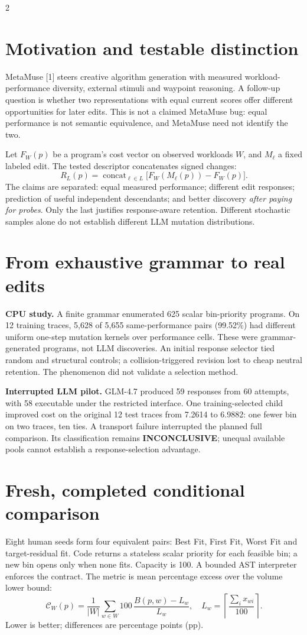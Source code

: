 \documentclass[10pt,letterpaper]{article}
\newcommand{\cost}{\mathcal{C}}
\begin{document}
\begin{multicols}{2}
\section{Motivation and testable distinction}
MetaMuse [1] steers creative algorithm generation with measured workload-performance diversity, external stimuli and waypoint reasoning. A follow-up question is whether two representations with equal current scores offer different opportunities for later edits. This is not a claimed MetaMuse bug: equal performance is not semantic equivalence, and MetaMuse need not identify the two.

Let $F_W(p)$ be a program's cost vector on observed workloads $W$, and $M_\ell$ a fixed labeled edit. The tested descriptor concatenates signed changes:
\[
R_L(p)=\mathop{\mathrm{concat}}_{\ell\in L}
\bigl[F_W(M_\ell(p))-F_W(p)\bigr].
\]
The claims are separated: equal measured performance; different edit responses; prediction of useful independent descendants; and better discovery \emph{after paying for probes}. Only the last justifies response-aware retention. Different stochastic samples alone do not establish different LLM mutation distributions.

\section{From exhaustive grammar to real edits}
\textbf{CPU study.} A finite grammar enumerated 625 scalar bin-priority programs. On 12 training traces, 5,628 of 5,655 same-performance pairs (99.52\%) had different uniform one-step mutation kernels over performance cells. These were grammar-generated programs, not LLM discoveries. An initial response selector tied random and structural controls; a collision-triggered revision lost to cheap neutral retention. The phenomenon did not validate a selection method.

\textbf{Interrupted LLM pilot.} GLM-4.7 produced 59 responses from 60 attempts, with 58 executable under the restricted interface. One training-selected child improved cost on the original 12 test traces from 7.2614 to 6.9882: one fewer bin on two traces, ten ties. A transport failure interrupted the planned full comparison. Its classification remains \textbf{INCONCLUSIVE}; unequal available pools cannot establish a response-selection advantage.

\section{Fresh, completed conditional comparison}
Eight human seeds form four equivalent pairs: Best Fit, First Fit, Worst Fit and target-residual fit. Code returns a stateless scalar priority for each feasible bin; a new bin opens only when none fits. Capacity is 100. A bounded AST interpreter enforces the contract. The metric is mean percentage excess over the volume lower bound:
\[
\cost_W(p)=\frac{1}{|W|}\sum_{w\in W}
100\,\frac{B(p,w)-L_w}{L_w},\quad
L_w=\left\lceil\frac{\sum_i x_{wi}}{100}\right\rceil.
\]
Lower is better; differences are percentage points (pp).


\end{multicols}
\end{document}
